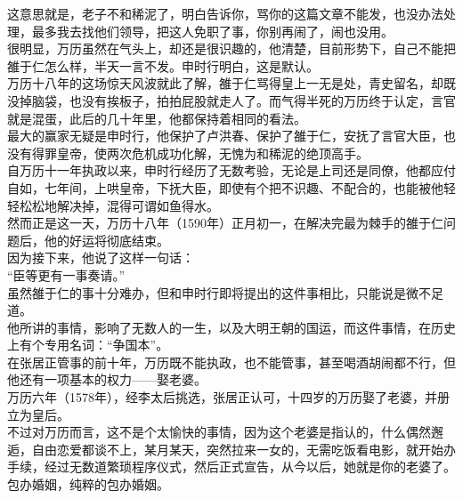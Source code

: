 \begin{multicols}{\theparacolNo}
这意思就是，老子不和稀泥了，明白告诉你，骂你的这篇文章不能发，也没办法处理，最多我去找他们领导，把这人免职了事，你别再闹了，闹也没用。\\

很明显，万历虽然在气头上，却还是很识趣的，他清楚，目前形势下，自己不能把雒于仁怎么样，半天一言不发。申时行明白，这是默认。\\

万历十八年的这场惊天风波就此了解，雒于仁骂得皇上一无是处，青史留名，却既没掉脑袋，也没有挨板子，拍拍屁股就走人了。而气得半死的万历终于认定，言官就是混蛋，此后的几十年里，他都保持着相同的看法。\\

最大的赢家无疑是申时行，他保护了卢洪春、保护了雒于仁，安抚了言官大臣，也没有得罪皇帝，使两次危机成功化解，无愧为和稀泥的绝顶高手。\\

自万历十一年执政以来，申时行经历了无数考验，无论是上司还是同僚，他都应付自如，七年间，上哄皇帝，下抚大臣，即使有个把不识趣、不配合的，也能被他轻轻松松地解决掉，混得可谓如鱼得水。\\

然而正是这一天，万历十八年（1590年）正月初一，在解决完最为棘手的雒于仁问题后，他的好运将彻底结束。\\

因为接下来，他说了这样一句话：\\

“臣等更有一事奏请。”\\

虽然雒于仁的事十分难办，但和申时行即将提出的这件事相比，只能说是微不足道。\\

他所讲的事情，影响了无数人的一生，以及大明王朝的国运，而这件事情，在历史上有个专用名词：“争国本”。\\

在张居正管事的前十年，万历既不能执政，也不能管事，甚至喝酒胡闹都不行，但他还有一项基本的权力——娶老婆。\\

万历六年（1578年），经李太后挑选，张居正认可，十四岁的万历娶了老婆，并册立为皇后。\\

不过对万历而言，这不是个太愉快的事情，因为这个老婆是指认的，什么偶然邂逅，自由恋爱都谈不上，某月某天，突然拉来一女的，无需吃饭看电影，就开始办手续，经过无数道繁琐程序仪式，然后正式宣告，从今以后，她就是你的老婆了。\\

包办婚姻，纯粹的包办婚姻。\\


\end{multicols}
